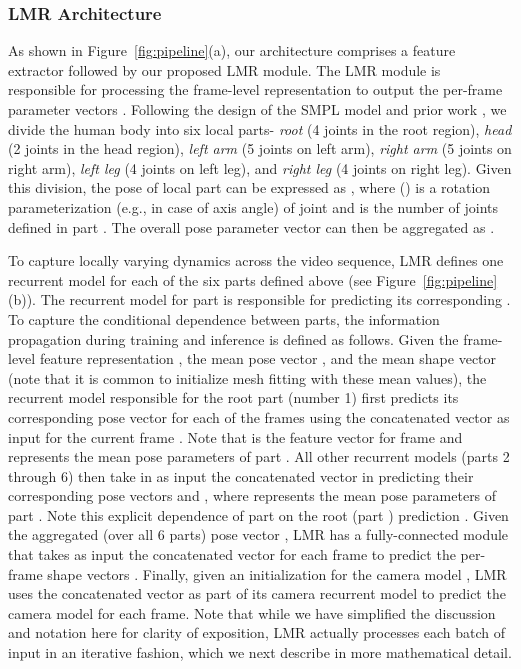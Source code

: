 \documentclass[10pt,twocolumn,letterpaper]{article}
\begin{document}
\subsubsection{LMR Architecture}
As shown in Figure~\ref{fig:pipeline}(a), our architecture comprises a feature extractor followed by our proposed LMR module. The LMR module is responsible for processing the frame-level representation  to output the per-frame parameter vectors . Following the design of the SMPL model and prior work \cite{loper2015smpl,georgakis2020hierarchical}, we divide the human body into six local parts- \textit{root} (4 joints in the root region), \textit{head} (2 joints in the head region), \textit{left arm} (5 joints on left arm), \textit{right arm} (5 joints on right arm), \textit{left leg} (4 joints on left leg), and \textit{right leg} (4 joints on right leg). Given this division, the pose of local part  can be expressed as , where  () is a rotation parameterization (e.g.,  in case of axis angle) of joint  and  is the number of joints defined in part . The overall pose parameter vector  can then be aggregated as . 


To capture locally varying dynamics across the video sequence, LMR defines one recurrent model for each of the six parts defined above (see Figure~\ref{fig:pipeline}(b)). The recurrent model for part  is responsible for predicting its corresponding . To capture the conditional dependence between parts, the information propagation during training and inference is defined as follows. Given the frame-level feature representation , the mean pose vector , and the mean shape vector  (note that it is common \cite{hmrKanazawa17,humanMotionKanazawa19,kocabas2019vibe} to initialize mesh fitting with these mean values), the recurrent model responsible for the root part (number 1) first predicts its corresponding pose vector  for each of the  frames using the concatenated vector  as input for the current frame . Note that  is the feature vector for frame  and  represents the mean pose parameters of part . All other recurrent models (parts 2 through 6) then take in as input the concatenated vector  in predicting their corresponding pose vectors  and , where  represents the mean pose parameters of part . Note this explicit dependence of part  on the root (part ) prediction . Given the aggregated (over all 6 parts) pose vector , LMR has a fully-connected module that takes as input the concatenated vector  for each frame  to predict the per-frame shape vectors . Finally, given an initialization for the camera model , LMR uses the concatenated vector  as part of its camera recurrent model to predict the camera model  for each frame. Note that while we have simplified the discussion and notation here for clarity of exposition, LMR actually processes each batch of input in an iterative fashion, which we next describe in more mathematical detail.  
\end{document}
